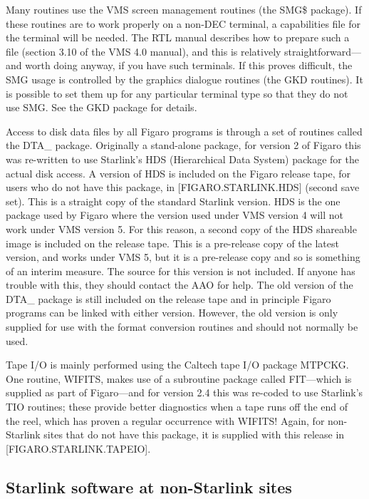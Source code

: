 Many routines use the VMS screen management routines (the SMG\$ package).  If
these routines are to work properly on a non-DEC terminal, a capabilities file
for the terminal will be needed. The RTL manual  describes how to prepare such
a file (section 3.10 of the VMS 4.0 manual), and this is relatively
straightforward---and worth doing anyway, if you have such terminals. If this
proves difficult, the SMG usage is controlled by the graphics dialogue routines
(the GKD routines). It is possible to set them up for any particular terminal
type so that they do not use SMG. See the GKD package for details.

Access to disk data files by all Figaro programs is through a set of routines 
called the DTA\_ package. Originally a stand-alone package, for version 2 of
Figaro this was re-written to use Starlink's HDS (Hierarchical Data System)
package for the actual disk access. A version of HDS is included on the Figaro
release tape, for users who do not have this package, in [FIGARO.STARLINK.HDS]
(second save set). This is a straight copy of the standard Starlink version.
HDS is the one package used by Figaro where the version used under VMS version
4 will not work under VMS version 5. For this reason, a second copy of the HDS
shareable image is included on the release tape. This is a pre-release copy of
the latest version, and works under VMS 5, but it is a pre-release copy and so
is something of an interim measure. The source for this version is not
included. If anyone has trouble with this,  they should contact the AAO for
help. The old version of the DTA\_ package is still included on the release
tape and in principle Figaro programs can be linked with either version.
However, the old version is only supplied for use with the format conversion
routines and should not normally be used.

Tape I/O is mainly performed using the Caltech tape I/O package MTPCKG. One
routine, WIFITS, makes use of a subroutine package called FIT---which is
supplied as part of Figaro---and for version 2.4 this was re-coded to use 
Starlink's TIO routines; these provide better diagnostics when a tape runs off
the end of the reel, which has proven a regular occurrence with WIFITS!  Again,
for non-Starlink sites that do not have this package, it is  supplied with this
release in [FIGARO.STARLINK.TAPEIO].

\subsection{Starlink software at non-Starlink sites}
	
